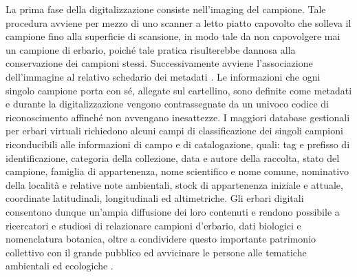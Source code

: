 \documentclass[main.tex]{subfiles}
\begin{document}
La prima fase della digitalizzazione consiste nell’imaging del campione. Tale procedura avviene per mezzo di uno scanner a letto piatto capovolto che solleva il campione fino alla superficie di scansione, in modo tale da non capovolgere mai un campione di erbario, poiché tale pratica risulterebbe dannosa alla conservazione dei campioni stessi. Successivamente avviene l’associazione dell’immagine al relativo schedario dei metadati \citep{mini}. Le informazioni che ogni singolo campione porta con sé, allegate sul cartellino, sono definite come metadati e durante la digitalizzazione vengono contrassegnate da un univoco codice di riconoscimento affinché non avvengano inesattezze.
I maggiori database gestionali per erbari virtuali richiedono alcuni campi di classificazione dei singoli campioni riconducibili alle informazioni di campo e di catalogazione, quali: tag e prefisso di identificazione, categoria della collezione, data e autore della raccolta, stato del campione, famiglia di appartenenza, nome scientifico e nome comune, nominativo della località e relative note ambientali, stock di appartenenza iniziale e attuale, coordinate latitudinali, longitudinali ed altimetriche.
Gli erbari digitali consentono dunque un’ampia diffusione dei loro contenuti e rendono possibile a ricercatori e studiosi di relazionare campioni d'erbario, dati biologici e nomenclatura botanica, oltre a condividere questo importante patrimonio collettivo con il grande pubblico ed avvicinare le persone alle tematiche ambientali ed ecologiche \citep{cleme}.
\end{document}
